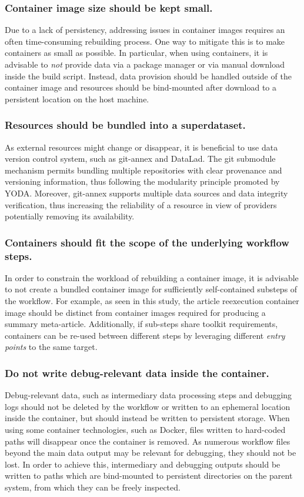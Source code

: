 \subsubsection{Container image size should be kept small.}
Due to a lack of persistency, addressing issues in container images requires an often time-consuming rebuilding process.
One way to mitigate this is to make containers as small as possible.
In particular, when using containers, it is advisable to \textit{not} provide data via a package manager or via manual download inside the build script.
Instead, data provision should be handled outside of the container image and resources should be bind-mounted after download to a persistent location on the host machine.

\subsubsection{Resources should be bundled into a superdataset.}
As external resources might change or disappear, it is beneficial to use data version control system, such as git-annex and DataLad.
The git submodule mechanism permits bundling multiple repositories with clear provenance and versioning information, thus following the modularity principle promoted by YODA.
Moreover, git-annex supports multiple data sources and data integrity verification, thus increasing the reliability of a resource in view of providers potentially removing its availability.

\subsubsection{Containers should fit the scope of the underlying workflow steps.}
In order to constrain the workload of rebuilding a container image, it is advisable to not create a bundled container image for sufficiently self-contained substeps of the workflow.
For example, as seen in this study, the article reexecution container image should be distinct from container images required for producing a summary meta-article.
Additionally, if sub-steps share toolkit requirements, containers can be re-used between different steps by leveraging different \emph{entry points} to the same target.

\subsubsection{Do not write debug-relevant data inside the container.}
Debug-relevant data, such as intermediary data processing steps and debugging logs should not be deleted by the workflow or written to an ephemeral location inside the container, but should instead be written to persistent storage.
When using some container technologies, such as Docker, files written to hard-coded paths will disappear once the container is removed.
As numerous workflow files beyond the main data output may be relevant for debugging, they should not be lost.
In order to achieve this, intermediary and debugging outputs should be written to paths which are bind-mounted to persistent directories on the parent system, from which they can be freely inspected.

